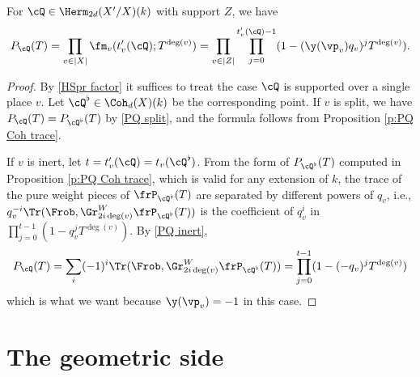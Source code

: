 \begin{prop}
\notready\label{p:PQ trace} For $\cQ\in \Herm_{2d}(X'/X)(k)$ with support $Z$, we have
\[
P_{\cQ}(T)=\prod_{v\in |X|}\fm_{v}(t'_{v}(\cQ); T^{\deg(v)}) = \prod_{v\in |Z|}\prod_{j=0}^{t'_{v}(\cQ)-1}(1-(\y(\vp_{v})q_{v})^{j}T^{\deg(v)}).
\]
\end{prop}
\begin{proof}
By \eqref{HSpr factor} it suffices to treat the case $\cQ$ is supported over a single place $v$. Let $\cQ^{\flat}\in \Coh_{d}(X)(k)$ be the corresponding point. If $v$ is split, we have $P_{\cQ}(T)=P_{\cQ^{\flat}}(T)$ by \eqref{PQ split}, and the formula follows from Proposition \ref{p:PQ Coh trace}.

If $v$ is inert, let $t=t'_{v}(\cQ)=t_{v}(\cQ^{\flat})$. From the form of $P_{\cQ^{\flat}}(T)$ computed in Proposition \ref{p:PQ Coh trace}, which is valid for any extension of $k$,  the trace of the pure weight pieces of $\frP_{\cQ^{\flat}}(T)$ are separated by different powers of $q_{v}$, i.e., $q_{v}^{-i}\Tr(\Frob, \Gr^{W}_{2i\deg(v)}\frP_{\cQ^{\flat}}(T))$ is   the coefficient of $q_{v}^{i}$ in $\prod_{j=0}^{t-1}(1-q_{v}^{j}T^{\deg(v)})$.  By \eqref{PQ inert},
\begin{equation*}
P_{\cQ}(T)=\sum_{i}(-1)^{i}\Tr(\Frob, \Gr^{W}_{2i\deg(v)}\frP_{\cQ^{\flat}}(T)) =\prod_{j=0}^{t-1}(1-(-q_{v})^{j}T^{\deg(v)})
\end{equation*}
which is what we want because $\y(\vp_{v})=-1$ in this case.
\end{proof}


\part{The geometric side}
